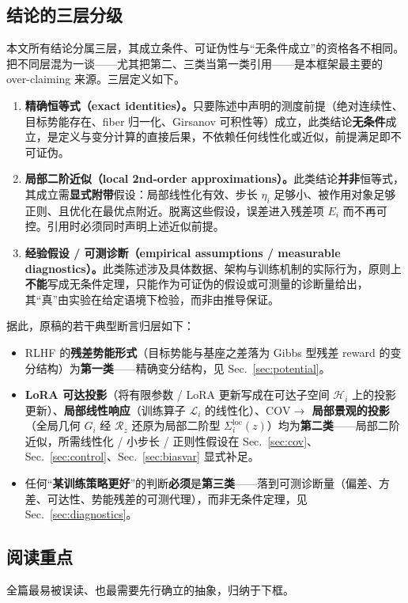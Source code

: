 \documentclass[11pt,a4paper]{article}
\newcommand{\cH}{\mathcal{H}}   %
\newcommand{\cL}{\mathcal{L}}   %
\newcommand{\Rstr}{\mathcal{R}}     %
\newcommand{\COV}{\mathrm{COV}}     %
\begin{document}
\subsection*{结论的三层分级}
本文所有结论分属三层，其成立条件、可证伪性与“无条件成立”的资格各不相同。把不同层混为一谈——尤其把第二、三类当第一类引用——是本框架最主要的 over-claiming 来源。三层定义如下。

\begin{enumerate}[label=\textbf{第\arabic*类},leftmargin=*]
\item \textbf{精确恒等式（exact identities）。}只要陈述中声明的测度前提（绝对连续性、目标势能存在、fiber 归一化、Girsanov 可积性等）成立，此类结论\textbf{无条件}成立，是定义与变分计算的直接后果，不依赖任何线性化或近似，前提满足即不可证伪。
\item \textbf{局部二阶近似（local 2nd-order approximations）。}此类结论\textbf{并非}恒等式，其成立需\textbf{显式附带}假设：局部线性化有效、步长 $\eta_i$ 足够小、被作用对象足够正则、且优化在最优点附近。脱离这些假设，误差进入残差项 $E_i$ 而不再可控。引用时必须同时声明上述近似前提。
\item \textbf{经验假设 / 可测诊断（empirical assumptions / measurable diagnostics）。}此类陈述涉及具体数据、架构与训练机制的实际行为，原则上\textbf{不能}写成无条件定理，只能作为可证伪的假设或可测量的诊断量给出，其“真”由实验在给定语境下检验，而非由推导保证。
\end{enumerate}

\noindent 据此，原稿的若干典型断言归层如下：
\begin{itemize}[leftmargin=*]
\item RLHF 的\textbf{残差势能形式}（目标势能与基座之差落为 Gibbs 型残差 reward 的变分结构）为\textbf{第一类}——精确变分结构，见 Sec.~\ref{sec:potential}。
\item \textbf{LoRA 可达投影}（将有限参数 / LoRA 更新写成在可达子空间 $\cH_i$ 上的投影更新）、\textbf{局部线性响应}（训练算子 $\cL_i$ 的线性化）、\textbf{$\COV\to$ 局部景观的投影}（全局几何 $G_i$ 经 $\Rstr_z$ 还原为局部二阶型 $\Sigma_i^{\mathrm{loc}}(z)$）均为\textbf{第二类}——局部二阶近似，所需线性化 / 小步长 / 正则性假设在 Sec.~\ref{sec:cov}、Sec.~\ref{sec:control}、Sec.~\ref{sec:biasvar} 显式补足。
\item 任何“\textbf{某训练策略更好}”的判断\textbf{必须}是\textbf{第三类}——落到可测诊断量（偏差、方差、可达性、势能残差的可测代理），而非无条件定理，见 Sec.~\ref{sec:diagnostics}。
\end{itemize}

\subsection*{阅读重点}
全篇最易被误读、也最需要先行确立的抽象，归纳于下框。
\end{document}
